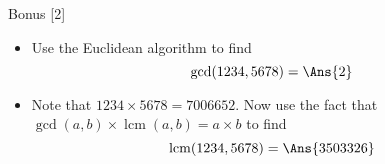 \documentclass[12pt,letterpaper]{article}
\begin{document}
\begin{problem}{Bonus [2]}
 \begin{itemize}
  \item Use the Euclidean algorithm to find \[
   \gcd(1234, 5678) = \Ans{2}
  \]

  \item Note that $1234 \times 5678 = 7006652$. Now use the fact that
  $\gcd(a, b) \times \operatorname{lcm}(a, b) = a \times b$ to find \[
   \operatorname{lcm}(1234, 5678) = \Ans{3503326}
  \]
 \end{itemize}
\end{problem}
\end{document}
